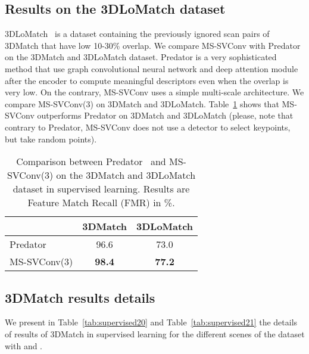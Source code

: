\documentclass[10pt,twocolumn,letterpaper]{article}
\begin{document}
\subsection{Results on the 3DLoMatch dataset}
3DLoMatch~\cite{huang2020predator} is a dataset containing the previously ignored scan pairs of 3DMatch that have low 10-30\% overlap.
We compare MS-SVConv with Predator~\cite{huang2020predator} on the 3DMatch and 3DLoMatch dataset. Predator is a very sophisticated method that use graph convolutional neural network and deep attention module after the encoder to compute meaningful descriptors even when the overlap is very low. On the contrary, MS-SVConv uses a simple multi-scale architecture.
We compare MS-SVConv(3) on 3DMatch and 3DLoMatch. Table~\ref{tab:fmr_lo_3dm} shows that MS-SVConv outperforms Predator on 3DMatch and 3DLoMatch (please, note that contrary to Predator, MS-SVConv does not use a detector to select keypoints, but take random points).
\begin{table}[ht]
\small
\centering
\begin{tabular}[t]{lcc}
\toprule
 & 3DMatch & 3DLoMatch\\
\midrule
Predator~\cite{huang2020predator} & 96.6 & 73.0 \\
MS-SVConv(3) & \bf{98.4} & \bf{77.2}\\
\bottomrule
\end{tabular}
\caption{Comparison between Predator~\cite{huang2020predator} and MS-SVConv(3) on the 3DMatch and 3DLoMatch dataset in supervised learning. Results are Feature Match Recall (FMR) in \%.}
\label{tab:fmr_lo_3dm}
\end{table}


\subsection{3DMatch results details}

We present in Table~\ref{tab:supervised20} and Table~\ref{tab:supervised21} the details of results of 3DMatch in supervised learning for the different scenes of the dataset with  and . 
\end{document}
